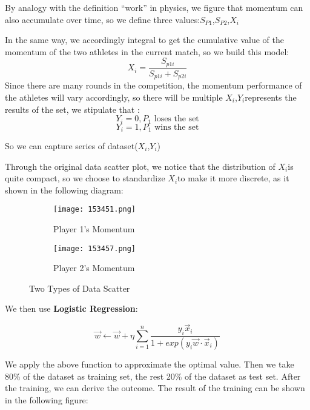 \documentclass{mcmthesis}
\begin{document}
By analogy with the definition “work” in physics, we figure that momentum can also
accumulate over time, so we define three values:$S_{P1}$,$S_{P2}$,$X_{i}$

In the same way, we accordingly integral to get the cumulative value of the momentum of the
two athletes in the current match, so we build this model:
\begin{equation} \label{3}
    X_{i}=\frac{S_{p1i}}{S_{p1i}+S_{p2i}}  
\end{equation}
Since there are many rounds in the competition, the momentum performance of the athletes
will vary accordingly, so there will be multiple $X_{i}$,$Y_{i}$represents the results of the set, we stipulate
that :
\begin{equation} \label{4}
    Y_{i} = 0, P_{1} \text{ loses the set}
\end{equation}
\begin{equation} \label{5}
    Y_{i} = 1, P_{1} \text{ wins the set}
\end{equation}

So we can capture series of dataset($X_{i}$,$Y_{i}$)

Through the original data scatter plot, we notice that the distribution of $X_{i}$is quite compact, so we choose to standardize $X_{i}$to make it more discrete, as it shown in the following diagram:

\begin{figure}[H]
    \centering
    \begin{subfigure}{0.45\textwidth}
        \centering
        \texttt{[image: 153451.png]}
        \caption{Player 1's Momentum}
        \label{subfig:player1}
    \end{subfigure}
    \hfill
    \begin{subfigure}{0.45\textwidth}
        \centering
        \texttt{[image: 153457.png]}
        \caption{Player 2's Momentum}
        \label{subfig:player2}
    \end{subfigure}
    \caption{Two Types of Data Scatter}
    \label{Figure 13}
\end{figure}

We then use {\bf Logistic Regression}:

\begin{equation} \label{6}
    \vec{w}\gets \vec{w}+\eta \sum_{i=1}^{n} \frac{y_{i}\vec{x}_{i}}{1+exp(y_{i}\vec{w}\cdot\vec{x}_{i}) }
\end{equation}

We apply the above function to approximate the optimal value. Then we take 80\% of the
dataset as training set, the rest 20\% of the dataset as test set.\cite{[5]} After the training, we can derive
the outcome. The result of the training can be shown in the following figure:
\end{document}
